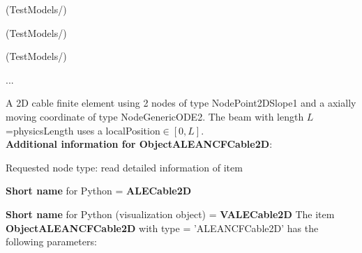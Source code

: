 \item {} (TestModels/)
\item {} (TestModels/)
\item {} (TestModels/)
\item  ...

\ei

%
\newpage

\label{sec:item:ObjectALEANCFCable2D}
A 2D cable finite element using 2 nodes of type NodePoint2DSlope1 and a axially moving coordinate of type NodeGenericODE2. The beam with length $L$=physicsLength uses a localPosition$\in [0, L]$.\vspace{12pt}
 \\{\bf Additional information for ObjectALEANCFCable2D}:
\bi
  \item Requested node type: read detailed information of item
  \item {\bf Short name} for Python = {\bf ALECable2D}  \item {\bf Short name} for Python (visualization object) = {\bf VALECable2D}\ei
\vspace{12pt} \noindent The item {\bf ObjectALEANCFCable2D} with type = 'ALEANCFCable2D' has the following parameters:\vspace{-1cm}\\ 
